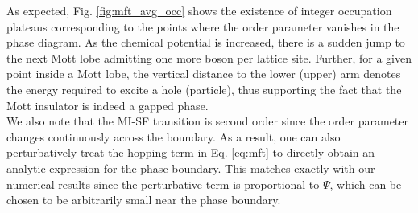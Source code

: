 As expected, Fig. \ref{fig:mft_avg_occ} shows the existence of integer occupation plateaus corresponding to the points where the order parameter vanishes in the phase diagram. As the chemical potential is increased, there is a sudden jump to the next Mott lobe admitting one more boson per lattice site. Further, for a given point inside a Mott lobe, the vertical distance to the lower (upper) arm denotes the energy required to excite a hole (particle), thus supporting the fact that the Mott insulator is indeed a gapped phase. 
\vspace{0.5cm}\\
We also note that the MI-SF transition is second order since the order parameter changes continuously across the boundary. As a result, one can also perturbatively treat the hopping term in Eq. \ref{eq:mft} to directly obtain an analytic expression for the phase boundary\cite{Cubela19}. This matches exactly with our numerical results since the perturbative term is proportional to $\Psi$, which can be chosen to be arbitrarily small near the phase boundary. 


